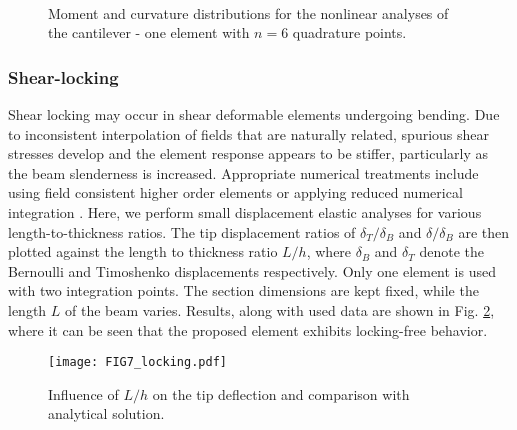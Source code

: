 \begin{figure}[b]
	\centering
	\hspace*{-0.47cm}\\
	\hspace*{-0.47cm}
	\caption{Moment and curvature distributions for the nonlinear 
		analyses of the cantilever - one element with $n=6$ quadrature points.}
	\label{fig:FIG6_MQN}
\end{figure}

\clearpage

\subsubsection{Shear-locking}
Shear locking may occur in shear deformable elements undergoing bending.
Due to inconsistent interpolation of fields that are naturally related, spurious
shear stresses develop and the element response appears to be stiffer,
particularly as the beam slenderness is increased. Appropriate numerical
treatments include using field consistent higher order elements or applying
reduced numerical integration \cite{Reddy,Prathap,ZienShear}. Here, we perform
small displacement elastic analyses for various length-to-thickness
ratios. The tip displacement ratios of $\delta_T/\delta_B$ and $\delta/\delta_B$
are then plotted against the length to thickness ratio $L/h$, where $\delta_B$
and $\delta_T$ denote the Bernoulli and Timoshenko displacements respectively.
Only one element is used with two integration points. The section dimensions
are kept fixed, while the length $L$ of the beam varies. Results, along
with used data are shown in Fig. \ref{fig:FIG7_lock}, where it can be seen 
that the
proposed element exhibits locking-free behavior.

\begin{figure}[t]
	\centering
	\texttt{[image: FIG7\_locking.pdf]}
	\caption{Influence of $L/h$ on the tip deflection and comparison with
		analytical solution.}
	\label{fig:FIG7_lock}
\end{figure}


